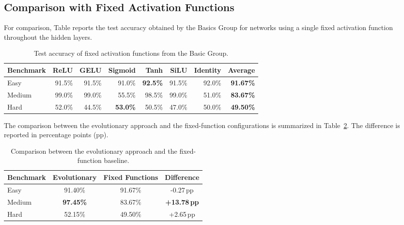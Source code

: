 \documentclass[12pt,fleqn,a4paper]{article}
\begin{document}
\newpage

\subsection{Comparison with Fixed Activation Functions}

For comparison, Table reports the test accuracy obtained by the Basics Group for networks using a single fixed activation function throughout the hidden layers.

\begin{table}[ht]
    \centering
    \caption{Test accuracy of fixed activation functions from the Basic Group.}
    \label{tab:fixed_activation}
    \renewcommand{\arraystretch}{1.15}
    \begin{tabular}{lrrrrrrr}
        \toprule
        \textbf{Benchmark}
        & \textbf{ReLU}
        & \textbf{GELU}
        & \textbf{Sigmoid}
        & \textbf{Tanh}
        & \textbf{SiLU}
        & \textbf{Identity}
        & \textbf{Average} \\
        \midrule
        Easy
        & 91.5\%
        & 91.5\%
        & 91.0\%
        & \textbf{92.5\%}
        & 91.5\%
        & 92.0\%
        & \textbf{91.67\%} \\

        Medium
        & 99.0\%
        & 99.0\%
        & 55.5\%
        & 98.5\%
        & 99.0\%
        & 51.0\%
        & \textbf{83.67\%} \\

        Hard
        & 52.0\%
        & 44.5\%
        & \textbf{53.0\%}
        & 50.5\%
        & 47.0\%
        & 50.0\%
        & \textbf{49.50\%} \\
        \bottomrule
    \end{tabular}
\end{table}

The comparison between the evolutionary approach and the fixed-function configurations is summarized in Table~\ref{tab:7}. The difference is reported in percentage points (pp).

\begin{table}[ht]
\centering
\caption{Comparison between the evolutionary approach and the fixed-function baseline.}
\label{tab:7}
\renewcommand{\arraystretch}{1.2}
\begin{tabular}{lccc}
    \toprule
    \textbf{Benchmark}
    & \textbf{Evolutionary}
    & \textbf{Fixed Functions}
    & \textbf{Difference} \\
    \midrule
    Easy
    & 91.40\%
    & 91.67\%
    & -0.27\,pp \\
    Medium
    & \textbf{97.45\%}
    & 83.67\%
    & \textbf{+13.78\,pp} \\
    Hard
    & 52.15\%
    & 49.50\%
    & +2.65\,pp \\
    \bottomrule
\end{tabular}

\end{table}
\end{document}
